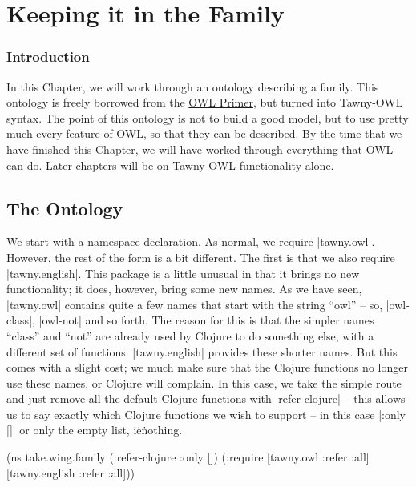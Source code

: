 \chapter{Keeping it in the Family}
\label{cha:keeping-it-family}

\subsection{Introduction}
\label{sec:introduction-family}

In this Chapter, we will work through an ontology describing a family.
This ontology is freely borrowed from the
\href{https://www.w3.org/TR/owl2-primer/}{OWL Primer}, but turned into
Tawny-OWL syntax. The point of this ontology is not to build a good
model, but to use pretty much every feature of OWL, so that they can
be described.  By the time that we have finished this Chapter, we will
have worked through everything that OWL can do. Later chapters will be
on Tawny-OWL functionality alone.


\section{The Ontology}
\label{sec:ontology}

We start with a namespace declaration. As normal, we require
|tawny.owl|. However, the rest of the form is a bit different. The
first is that we also require |tawny.english|. This package is a
little unusual in that it brings no new functionality; it does,
however, bring some new names. As we have seen, |tawny.owl| contains
quite a few names that start with the string ``owl'' -- so,
|owl-class|, |owl-not| and so forth. The reason for this is that the
simpler names ``class'' and ``not'' are already used by Clojure to do
something else, with a different set of functions. |tawny.english|
provides these shorter names. But this comes with a slight cost; we
much make sure that the Clojure functions no longer use these names,
or Clojure will complain. In this case, we take the simple route and
just remove all the default Clojure functions with |refer-clojure| --
this allows us to say exactly which Clojure functions we wish to
support -- in this case |:only []| or only the empty list,
i\.e\. nothing.

\begin{tawny}
(ns take.wing.family
  (:refer-clojure :only [])
  (:require [tawny.owl :refer :all]
            [tawny.english :refer :all]))
\end{tawny}

